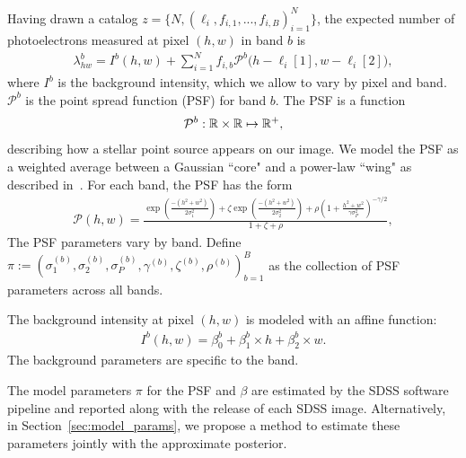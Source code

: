 Having drawn a catalog $z = \{N, (\ell_i, f_{i,1}, ..., f_{i,B})_{i = 1}^N\}$,
the expected number of photoelectrons measured at pixel $(h,w)$ in band $b$ is
\begin{align}
  \lambda^b_{hw} = I^{b}(h, w) + \sum_{i = 1}^N f_{i,b} \mathcal{P}^b\big(h - \ell_{i}[1], w - \ell_{i}[2]\big),
  \label{eq:expected_intensity}
\end{align}
where $I^{b}$ is the background intensity, which we allow to vary by pixel and band. $\mathcal{P}^b$ is the point spread function (PSF) for band $b$. The PSF
is a function 
\begin{align}
\mathcal{P}^b : \mathbb{R} \times \mathbb{R} \mapsto \mathbb{R}^+,
\end{align}
describing how a stellar point source appears
on our image. We model the PSF as a weighted average between a Gaussian ``core" and a power-law ``wing" as described in~\cite{Xin2018psf}. For each band, the PSF has the form
\begin{align}
    \mathcal{P}(h, w) = \frac{\exp(\frac{-(h^2 + w^2)}{2\sigma_1^2}) + 
                            \zeta \exp(\frac{-(h^2 + w^2)}{2\sigma_2^2}) + 
                            \rho(1 + \frac{h^2 + w^2}{\gamma\sigma^2_P})^{-\gamma/2} }{1 + \zeta + \rho},
\end{align}
The PSF parameters vary by band. Define 
$\pi := (\sigma_{1}^{(b)}, \sigma_{2}^{(b)}, \sigma_{P}^{(b)}, \gamma^{(b)}, \zeta^{(b)}, \rho^{(b)})_{b=1}^B$ as the collection of PSF parameters across all bands. 

The background intensity at pixel $(h,w)$ is modeled with an affine function: 
\begin{align}
    I^{b}(h,w) = \beta_0^{b} + \beta_1^{b} \times h + \beta_2^{b} \times w.
\end{align}
The background parameters are specific to the band. 

The model parameters $\pi$ for the PSF and $\beta$ are estimated by the SDSS software pipeline and reported along with the release of each SDSS image. Alternatively, in Section~\ref{sec:model_params}, we propose a method to estimate these parameters jointly with the approximate posterior. 

